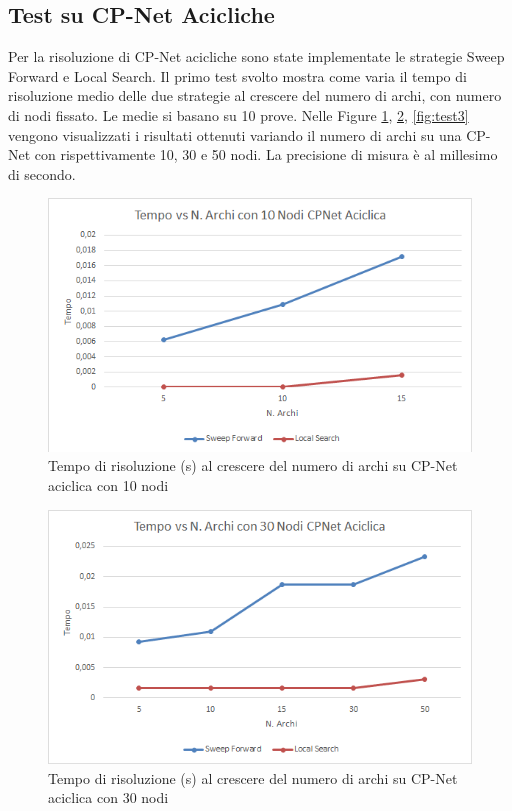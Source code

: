 \documentclass[a4paper,titlepage]{article}
\begin{document}
\subsection{Test su CP-Net Acicliche}
Per la risoluzione di CP-Net acicliche sono state implementate le strategie Sweep Forward e Local Search. Il primo test svolto mostra come varia il tempo di risoluzione medio delle due strategie al crescere del numero di archi, con numero di nodi fissato. Le medie si basano su 10 prove. Nelle Figure \ref{fig:test1}, \ref{fig:test2}, \ref{fig:test3} vengono visualizzati i risultati ottenuti variando il numero di archi su una CP-Net con rispettivamente 10, 30 e 50 nodi. La precisione di misura è al millesimo di secondo.
\begin{figure}[!h]
\centering
\includegraphics[scale=0.8]{../img/10NodiAciclica.png}
\caption{Tempo di risoluzione (s) al crescere del numero di archi su CP-Net aciclica con 10 nodi}\label{fig:test1}
\end{figure}
\begin{figure}[!h]
\centering
\includegraphics[scale=0.8]{../img/30NodiAciclica.png}
\caption{Tempo di risoluzione (s) al crescere del numero di archi su CP-Net aciclica con 30 nodi}\label{fig:test2}
\end{figure}
\end{document}
